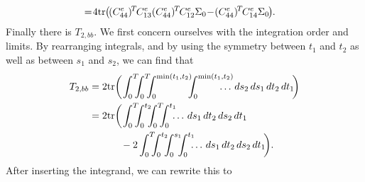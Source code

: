 \documentclass[twocolumn]{autart}
\begin{document}
\begin{pf}
\begin{align}
& \hspace{-2pt}=\hspace{-2pt} 4\mbox{tr}\hspace{-2pt}\left(\hspace{-1pt}(C_{44}^e)\hspace{-1pt}^T\hspace{-1pt} C_{13}^e (C_{44}^e)\hspace{-1pt}^T\hspace{-1pt} C_{12}^e \Sigma_0 \hspace{-2pt}-\hspace{-2pt} (C_{44}^e)\hspace{-1pt}^T\hspace{-1pt} C_{14}^e \Sigma_0\hspace{-1pt}\right)\hspace{-2pt}.
\end{align}
Finally there is $T_{2,bb}$. We first concern ourselves with the integration order and limits. By rearranging integrals, and by using the symmetry between $t_1$ and $t_2$ as well as between $s_1$ and $s_2$, we can find that
\begin{align}
T_{2,bb} & = 2\tr\bigg(\hspace{-1pt}\int_0^T \hspace{-6pt} \int_0^T \hspace{-6pt} \int_0^{\min(t_1,t_2)} \hspace{-6pt} \int_0^{\min(t_1,t_2)} \hspace{-16pt} \ldots \, ds_2 \, ds_1 \, dt_2 \, dt_1\hspace{-2pt}\bigg) \nonumber \\
& = 2\tr\bigg(\hspace{-1pt}\int_0^T \hspace{-6pt} \int_0^{t_2} \hspace{-6pt} \int_0^T \hspace{-6pt} \int_0^{t_1} \hspace{-6pt} \ldots \, ds_1 \, dt_2 \, ds_2 \, dt_1 \nonumber \\
& \hspace{32pt} - 2\int_0^T \hspace{-6pt} \int_0^{t_2} \hspace{-6pt} \int_0^{s_1} \hspace{-6pt} \int_0^{t_1} \hspace{-6pt} \ldots \, ds_1 \, dt_2 \, ds_2 \, dt_1\hspace{-2pt}\bigg).
\end{align}
After inserting the integrand, we can rewrite this to

\end{pf}
\end{document}
